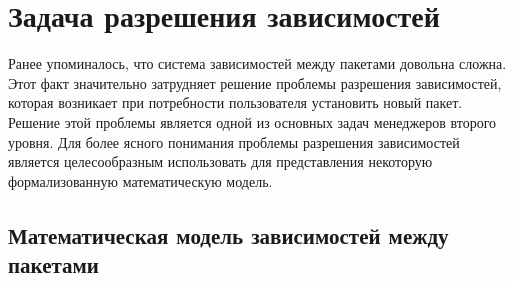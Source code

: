 \section{Задача разрешения зависимостей}
Ранее упоминалось, что система зависимостей между пакетами довольна сложна. Этот факт 
значительно затрудняет решение проблемы разрешения зависимостей, которая возникает
при потребности пользователя установить новый пакет. Решение этой проблемы является одной
из основных задач менеджеров второго уровня.
Для более ясного понимания проблемы разрешения зависимостей является целесообразным использовать
для представления некоторую формализованную математическую модель.

\subsection{Математическая модель зависимостей между пакетами}
\label{sn:software_dependencies_model}

